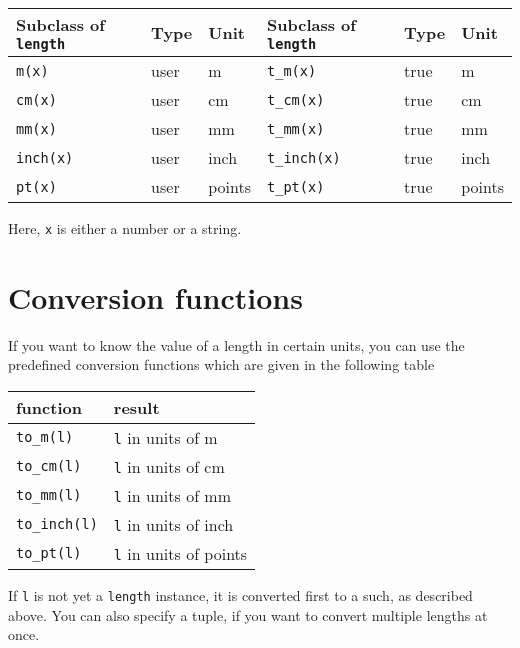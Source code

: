 \medskip
\begin{center}
\begin{tabular}{lll|lll}
Subclass of \texttt{length} & Type & Unit & Subclass of \texttt{length} & Type & Unit\\
\hline
\texttt{m(x)} & user & m & \texttt{t\_m(x)} & true & m\\
\texttt{cm(x)} & user & cm & \texttt{t\_cm(x)} & true & cm\\
\texttt{mm(x)} & user & mm & \texttt{t\_mm(x)} & true & mm\\
\texttt{inch(x)} & user & inch & \texttt{t\_inch(x)} & true & inch\\
\texttt{pt(x)} & user & points & \texttt{t\_pt(x)} & true & points\\
\end{tabular}
\end{center}
\medskip
Here, \verb|x| is either a number or a string.

\section{Conversion functions}
If you want to know the value of a \PyX{} length in certain units, you
can use the predefined conversion functions which are given in the
following table
\begin{center}
\begin{tabular}{ll}
function & result \\
\hline
\texttt{to\_m(l)} & \texttt{l} in units of m\\
\texttt{to\_cm(l)} & \texttt{l} in units of cm\\
\texttt{to\_mm(l)} & \texttt{l} in units of mm\\
\texttt{to\_inch(l)} & \texttt{l} in units of inch\\
\texttt{to\_pt(l)} & \texttt{l} in units of points\\
\end{tabular}
\end{center}
If \verb|l| is not yet a \verb|length| instance, it is converted first
to a such, as described above. You can also specify a tuple, if you
want to convert multiple lengths at once.







